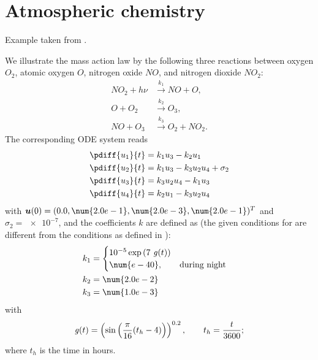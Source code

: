 \documentclass[biblatex]{mooiman_memo}
\renewcommand{\vec}[1]{\mbox{\boldmath $#1$} }
\begin{document}
    \memoConfidentialUntil{}
    \memoDate{\today~\currenttime}
    \memoCopy{}

    \mooimantitle

\section{Atmospheric chemistry}
Example taken from \cite[eq.\ 1.1, page 7]{HundsdorferAndVerwer2003}.

We illustrate the mass action law by the following three reactions between oxygen $O_2$, atomic oxygen $O$, nitrogen oxide $NO$, and nitrogen dioxide $NO_2$:
\begin{align}
    NO_2 + h\nu & \xrightarrow{k_1} NO + O, \\
    O + O_2 & \xrightarrow{k_2} O_3, \\
    NO + O_3 & \xrightarrow{k_3} O_2 + NO_2.
\end{align}
The corresponding ODE system reads
\begin{align}
    \pdiff{u_1}{t} & = k_1 u_3 -k_2 u_1
    \\
    \pdiff{u_2}{t} & = k_1 u_3 - k_3 u_2 u_4 +\sigma_2
    \\
    \pdiff{u_3}{t} & = k_3 u_2 u_4 - k_1 u_3
    \\
    \pdiff{u_4}{t} & = k_2 u_1 - k_3 u_2 u_4
\end{align}
with $\vec{u}(0) = (0.0, \num{2.0e-1}, \num{2.0e-3}, \num{2.0e-1})^T$ and $\sigma_2 = \num{e-7}$, and the coefficients $k$ are defined as (the given conditions for are different from the  conditions as defined in \cite[page  8]{HundsdorferAndVerwer2003}):
\begin{align}
    k_1 & = \begin{cases}
        10^{-5} \exp{(7\ {\it g}(t))}
        \\
        \num{e-40}, \qquad \text{during  night}
        \end{cases}
        \\
        k_2 & = \num{2.0e-2}
        \\
        k_3 & = \num{1.0e-3}
\end{align}
with
\begin{align}
    {\it g}(t) =\left(\sin\left(\frac{\pi}{16} (t_h - 4)\right)\right)^{0.2}, \qquad t_h = \frac{t}{3600};
\end{align}
where $t_h$ is the time in hours.
\end{document}
